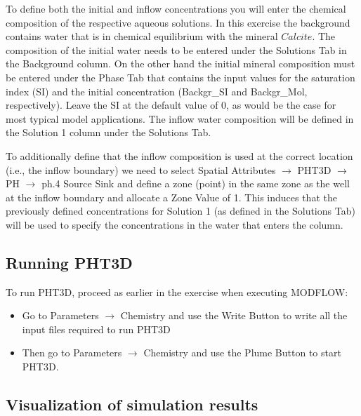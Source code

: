 To define both the initial and inflow concentrations 
you will enter the chemical composition of the respective aqueous solutions. 
In this exercise the background contains water that is in chemical equilibrium 
with the mineral $Calcite$. 
The composition of the initial water needs to be entered under the 
{\color{blue}Solutions} Tab in the {\color{blue}Background} column.
On the other hand the initial mineral composition must be entered 
under the {\color{blue}Phase} Tab that contains the input values 
for the saturation index (SI) and the initial concentration (Backgr\_SI and Backgr\_Mol, respectively).
Leave the SI at the default value of 0, as would be the case for most typical model applications.
The inflow water composition will be defined 
in the {\color{blue}Solution 1} column under the {\color{blue}Solutions} Tab.


To additionally define that the inflow composition is used at the correct location
(i.e., the inflow boundary) we need to select {\color{blue}Spatial Attributes} $\rightarrow$ 
{\color{blue}PHT3D} $\rightarrow$ {\color{blue}PH} $\rightarrow$ {\color{blue}ph.4 Source \/ Sink}
and define a zone (point) in the same zone as the well at the inflow boundary 
and allocate a {\color{blue}Zone Value} 
of 1. This induces that the previously defined concentrations 
for Solution 1 (as defined in the {\color{blue}Solutions} Tab) will be used to specify
the concentrations in the water that enters the column. 



\subsection[Running PHT3D]{Running PHT3D}

To run PHT3D, proceed as earlier in the exercise when executing MODFLOW:

\begin{itemize}

\item Go to {\color{blue}Parameters} $\rightarrow$ {\color{blue} Chemistry} and use 
the {\color{blue}Write Button} to write all the input files required to run PHT3D

\item Then go to {\color{blue}Parameters} $\rightarrow$ {\color{blue}Chemistry} and use the {\color{blue}Plume Button} to start PHT3D.

\end{itemize}


\subsection[Visualization of simulation results]{Visualization of simulation results}

